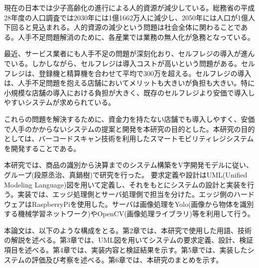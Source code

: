 現在の日本では少子高齢化の進行による人的資源が減少している。総務省の平成28年度の人口調査では2030年には1億1662万人に減少し、2050年には人口が1億人下回ると見込まれる\cite{population}。人的資源の減少という問題は社会全体に関わることである。人手不足問題解消のために、各産業では業務の無人化が急務となっている。

最近、サービス業者にも人手不足の問題が深刻化おり、セルフレジの導入が進んでいる。しかしながら、セルフレジは導入コストが高いという問題がある。セルフレジは、登録機と精算機を合わせて平均で300万を超える\cite{self_register}。セルフレジの導入は、人手不足問題を抱える店舗においてメリットも大きいが負担も大きい。特に小規模な店舗の導入における負担が大きく、既存のセルフレジより安価で導入しやすいシステムが求められている。

これらの問題を解決するために、資金力を持たない店舗でも導入しやすく、安価で人手のかからないシステムの提案と開発を本研究の目的とした。本研究の目的としては、バーコードスキャン技術を利用したスマートモビリティレジシステムを開発することである。

本研究では、商品の識別から決算までのシステム構築をV字開発モデルに従い、グループ(段原丞治、真鍋樹)で研究を行った。
要求定義や設計はUML(Unified Modeling Language)図を用いて定義し、それをもとにシステムの設計と実装を行う。実装では、エッジ処理側とサーバ処理側で担当を分けた。エッジ側のハードウェアはRaspberryPiを使用した。サーバは画像処理をYolo(画像から物体を識別する機械学習ネットワーク)\cite{yolo}やOpenCV(画像処理ライブラリ)\cite{opencv}等を利用して行う。

本論文は、以下のような構成をとる。第2章では、本研究で使用した用語、技術の解説を述べる。第3章では、UML図を用いてシステムの要求定義、設計、検証項目を述べる。第4章では、実装内容と検証結果を示す。第5章では、実装したシステムの評価及び考察を述べる。第6章では、本研究のまとめを示す。
